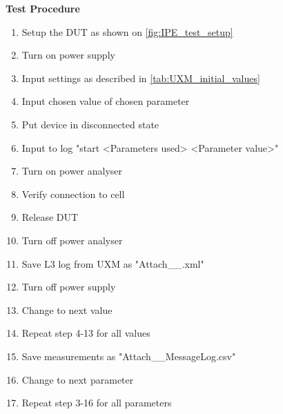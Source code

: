 \textbf{Test Procedure}\\
\begin{enumerate}
\item Setup the \gls{DUT} as shown on \autoref{fig:IPE_test_setup}
\item Turn on power supply 
\item Input settings as described in \autoref{tab:UXM_initial_values}
\item Input chosen value of chosen parameter
\item Put device in disconnected state 
\item Input to log "start <Parameters used> <Parameter value>"
\item Turn on power analyser
\item Verify connection to cell
\item Release DUT
\item Turn off power analyser
\item Save L3 log from UXM as "Attach\_<Parameters used>\_<Parameters value>.xml"
\item Turn off power supply
\item Change to next value
\item Repeat step 4-13 for all values
\item Save measurements as "Attach\_<Parameters used>\_MessageLog.csv"
\item Change to next parameter
\item Repeat step 3-16 for all parameters
\end{enumerate}


